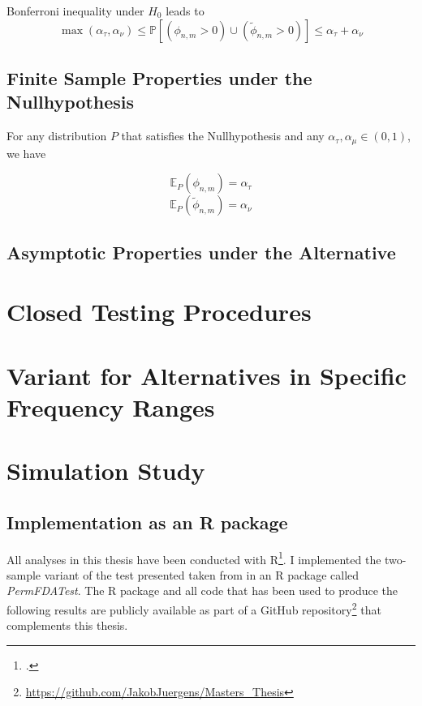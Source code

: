 \documentclass[12pt, a4paper]{article}
\theoremstyle{MAstyle} \newtheorem{assumption}{Assumption}[section]
\theoremstyle{MAstyle} \newtheorem{definition}{Definition}[section]
\begin{document}
			Bonferroni inequality under $H_0$ leads to
			\begin{equation}
				\max(\alpha_{\tau}, \alpha_{\nu}) \leq \mathbb{P}\left[(\phi_{n,m} > 0) \cup (\tilde{\phi}_{n,m} > 0)\right] \leq \alpha_{\tau} + \alpha_{\nu}
			\end{equation}
		
		\subsection{Finite Sample Properties under the Nullhypothesis}
		For any distribution $P$ that satisfies the Nullhypothesis and any $\alpha_{\tau}, \alpha_{\mu} \in (0,1)$, we have 
		\begin{multicols}{2}
			\noindent
			\begin{equation*}
				\mathbb{E}_P\left(\phi_{n,m}\right) = \alpha_{\tau}
			\end{equation*}			
			\begin{equation}
				\mathbb{E}_P\left(\tilde{\phi}_{n,m}\right) = \alpha_{\nu}
			\end{equation}
		\end{multicols}
		
		\subsection{Asymptotic Properties under the Alternative}
		
	\section{Closed Testing Procedures}
		
	\section{Variant for Alternatives in Specific Frequency Ranges}
		
		
	\section{Simulation Study}\label{Simulation_Study}
		\subsection{Implementation as an R package}
			All analyses in this thesis have been conducted with R\footcite{R}. I implemented the two-sample variant of the test presented taken from \cite{bugni_permutation_2021} in an R package called \textit{PermFDATest}. The R package and all code that has been used to produce the following results are publicly available as part of a GitHub repository\footnote{\href{https://github.com/JakobJuergens/Masters_Thesis}{https://github.com/JakobJuergens/Masters\_Thesis}} that complements this thesis.
			
\end{document}
